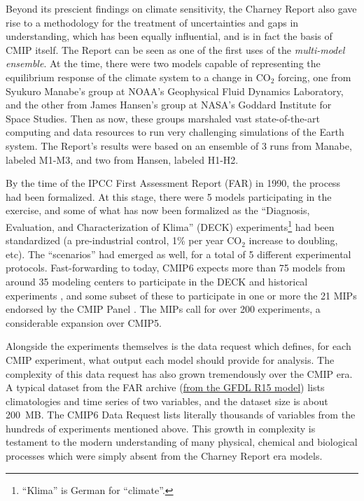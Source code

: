 \documentclass[gmd,manuscript]{copernicus}
\begin{document}
Beyond its prescient findings on climate sensitivity, the Charney
Report also gave rise to a methodology for the treatment of
uncertainties and gaps in understanding, which has been equally
influential, and is in fact the basis of CMIP itself. The Report can
be seen as one of the first uses of the \emph{multi-model ensemble}.
At the time, there were two models capable of representing the
equilibrium response of the climate system to a change in CO$_2$
forcing, one from Syukuro Manabe's group at NOAA's Geophysical Fluid
Dynamics Laboratory, and the other from James Hansen's group at NASA's
Goddard Institute for Space Studies. Then as now, these groups
marshaled vast state-of-the-art computing and data resources to run
very challenging simulations of the Earth system. The Report's results
were based on an ensemble of 3 runs from Manabe, labeled M1-M3, and
two from Hansen, labeled H1-H2.

By the time of the IPCC First Assessment Report (FAR) in 1990, the
process had been formalized. At this stage, there were 5 models
participating in the exercise, and some of what has now been
formalized as the ``Diagnosis, Evaluation, and Characterization of
Klima'' (DECK) experiments\footnote{``Klima'' is German for
  ``climate''.} had been standardized (a pre-industrial control, 1\%
per year CO$_2$ increase to doubling, etc). The ``scenarios'' had
emerged as well, for a total of 5 different experimental protocols.
Fast-forwarding to today, CMIP6 expects more than 75 models from
around 35 modeling centers \citep[in 14 countries, a stark contrast
to the US monopoly in][]{ref:charneyetal1979} to participate in the
DECK and historical experiments \citep[Table~2
of][]{ref:eyringetal2016a}, and some subset of these to participate in
one or more the 21 MIPs endorsed by the CMIP Panel \citep[Table~3
of][]{ref:eyringetal2016a}. The MIPs call for over 200 experiments, a
considerable expansion over CMIP5.

Alongside the experiments themselves is the data request which
defines, for each CMIP experiment, what output each model should
provide for analysis. The complexity of this data request has also
grown tremendously over the CMIP era. A typical dataset from the FAR
archive (\href{https://goo.gl/M1WSJy}{from the GFDL R15 model}) lists
climatologies and time series of two variables, and the dataset size
is about 200~MB. The CMIP6 Data Request \cite{ref:juckesetal2015}
lists literally thousands of variables from the hundreds of
experiments mentioned above. This growth in complexity is testament to
the modern understanding of many physical, chemical and biological
processes which were simply absent from the Charney Report era models.
\end{document}
